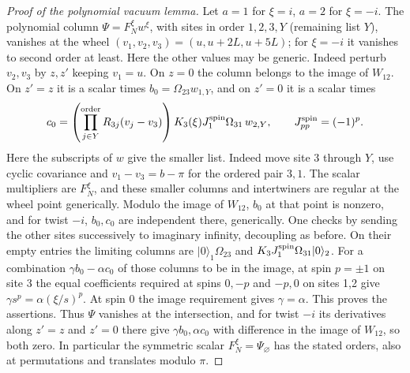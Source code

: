\begin{proof}[Proof of the polynomial vacuum lemma]
Let \(a=1\) for \(\xi=i\), \(a=2\) for \(\xi=-i\). The polynomial column \(\Psi=F_N^\xi w^\xi\), with sites in order \(1,2,3,Y\) (remaining list \(Y\)), vanishes at the wheel \((v_1,v_2,v_3)=(u,u+2L,u+5L)\); for \(\xi=-i\) it vanishes to second order at least. Here the other values may be generic. Indeed perturb \(v_2,v_3\) by \(z,z'\) keeping \(v_1=u\). On \(z=0\) the column belongs to the image of \(W_{12}\). On \(z'=z\) it is a scalar times \(b_0=\Omega_{23} w_{1,Y}\), and on \(z'=0\) it is a scalar times
\[
 c_0=\left(\prod_{j\in Y}^{\rm order}R_{3j}(v_j-v_3)\right) K_3(\xi) J_1^{\rm spin}\Omega_{31}\,w_{2,Y},
 \qquad J^{\rm spin}_{pp}=(-1)^p.
\]
Here the subscripts of \(w\) give the smaller list. Indeed move site 3 through \(Y\), use cyclic covariance and \(v_1-v_3=b-\pi\) for the ordered pair \(3,1\). The scalar multipliers are \(F_N^\xi\), and these smaller columns and intertwiners are regular at the wheel point generically. Modulo the image of \(W_{12}\), \(b_0\) at that point is nonzero, and for twist \(-i\), \(b_0,c_0\) are independent there, generically. One checks by sending the other sites successively to imaginary infinity, decoupling as before. On their empty entries the limiting columns are \(|0\rangle_1\Omega_{23}\) and \(K_3 J_1^{\rm spin}\Omega_{31}|0\rangle_2\). For a combination \(\gamma b_0-\alpha c_0\) of those columns to be in the image, at spin \(p=\pm1\) on site 3 the equal coefficients required at spins \(0,-p\) and \(-p,0\) on sites 1,2 give \(\gamma s^p=\alpha(\xi/s)^p\). At spin 0 the image requirement gives \(\gamma=\alpha\). This proves the assertions. Thus \(\Psi\) vanishes at the intersection, and for twist \(-i\) its derivatives along \(z'=z\) and \(z'=0\) there give \(\gamma b_0,\alpha c_0\) with difference in the image of \(W_{12}\), so both zero. In particular the symmetric scalar \(F_N^\xi=\Psi_\varnothing\) has the stated orders, also at permutations and translates modulo \(\pi\).


\end{proof}
